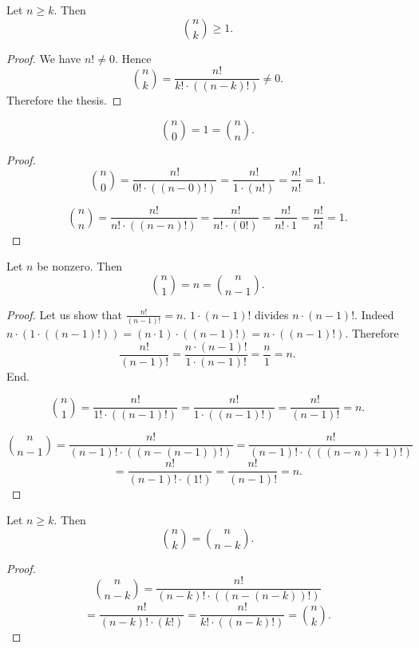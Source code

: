 \documentclass[../../arithmetic.tex]{subfiles}
\begin{document}
  \begin{forthel}
    \begin{proposition}\label{Arithmetic_03_06_502271}
      Let $n \geq k$.
      Then \[ \binom{n}{k} \geq 1. \]
    \end{proposition}
    \begin{proof}
      We have $n! \neq 0$.
      Hence \[ \binom{n}{k} = \frac{n!}{k! \cdot ((n - k)!)} \neq 0. \]
      Therefore the thesis.
    \end{proof}

    \begin{proposition}\label{Arithmetic_03_06_766613}
      \[ \binom{n}{0} = 1 = \binom{n}{n}. \]
    \end{proposition}
    \begin{proof}
      \[ \binom{n}{0}
          = \frac{n!}{0! \cdot ((n - 0)!)}
          = \frac{n!}{1 \cdot (n!)}
          = \frac{n!}{n!}
          = 1. \]

      \[ \binom{n}{n}
          = \frac{n!}{n! \cdot ((n - n)!)}
          = \frac{n!}{n! \cdot (0!)}
          = \frac{n!}{n! \cdot 1}
          = \frac{n!}{n!}
          = 1. \]
    \end{proof}

    \begin{proposition}\label{Arithmetic_03_06_877389}
      Let $n$ be nonzero.
      Then \[ \binom{n}{1} = n = \binom{n}{n - 1}. \]
    \end{proposition}
    \begin{proof}
      Let us show that $\frac{n!}{(n - 1)!} = n$.
        $1 \cdot (n - 1)!$ divides $n \cdot (n - 1)!$.
        Indeed $n \cdot (1 \cdot ((n - 1)!)) = (n \cdot 1) \cdot ((n - 1)!) = n \cdot ((n - 1)!)$.
        Therefore
        \[ \frac{n!}{(n - 1)!}
           = \frac{n \cdot (n - 1)!}{1 \cdot (n - 1)!}
           = \frac{n}{1}
           = n. \]
      End.

      \[ \binom{n}{1}
          = \frac{n!}{1! \cdot ((n - 1)!)}
          = \frac{n!}{1 \cdot ((n - 1)!)}
          = \frac{n!}{(n - 1)!}
          = n. \]

      \[ \binom{n}{n - 1}
          = \frac{n!}{(n - 1)! \cdot ((n - (n - 1))!)}
          = \frac{n!}{(n - 1)! \cdot (((n - n) + 1)!)} \]
      \[  = \frac{n!}{(n - 1)! \cdot (1!)}
          = \frac{n!}{(n - 1)!}
          = n. \]
    \end{proof}

    \begin{proposition}\label{Arithmetic_03_06_360382}
      Let $n \geq k$.
      Then \[ \binom{n}{k} = \binom{n}{n - k}. \]
    \end{proposition}
    \begin{proof}
      \[ \binom{n}{n - k}
          = \frac{n!}{(n - k)! \cdot ((n - (n - k))!)} \]
      \[  = \frac{n!}{(n - k)! \cdot (k!)}
          = \frac{n!}{k! \cdot ((n - k)!)}
          = \binom{n}{k}. \]
    \end{proof}


\end{forthel}
\end{document}
